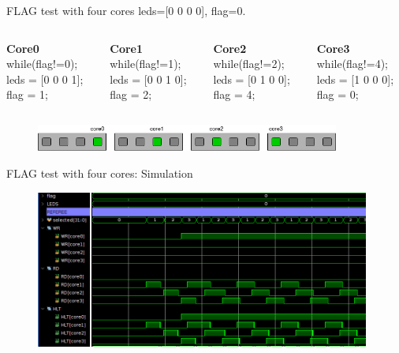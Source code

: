 \begin{frame}{FLAG test with four cores}
  leds=[0 0 0 0], flag=0.
  \begin{columns}[T]
    \begin{column}{0.25\textwidth}
    \textbf{Core0}\\
    while(flag!=0);\\
    leds = [0 0 0 1];\\
    flag = 1;\\
    \end{column}
    \begin{column}{0.25\textwidth}
    \textbf{Core1}\\
    while(flag!=1);\\
    leds = [0 0 1 0];\\
    flag = 2;\\
    \end{column}
    \begin{column}{0.25\textwidth}
    \textbf{Core2}\\
    while(flag!=2);\\
    leds = [0 1 0 0];\\
    flag = 4;\\
    \end{column}
    \begin{column}{0.25\textwidth}
    \textbf{Core3}\\
    while(flag!=4);\\
    leds = [1 0 0 0];\\
    flag = 0;\\
    \end{column}
 \end{columns}
  \begin{figure}
    \centering
    \includegraphics[width=10cm]{images/leds4_fig.png}
    \label{fig:my_label}
\end{figure}
\end{frame}

\begin{frame}{FLAG test with four cores: Simulation}
\begin{figure}
    \centering
    \includegraphics[width=11cm]{images/flag4_sim_bad_crop.png}
    \label{fig:my_label}
\end{figure}
\end{frame}

